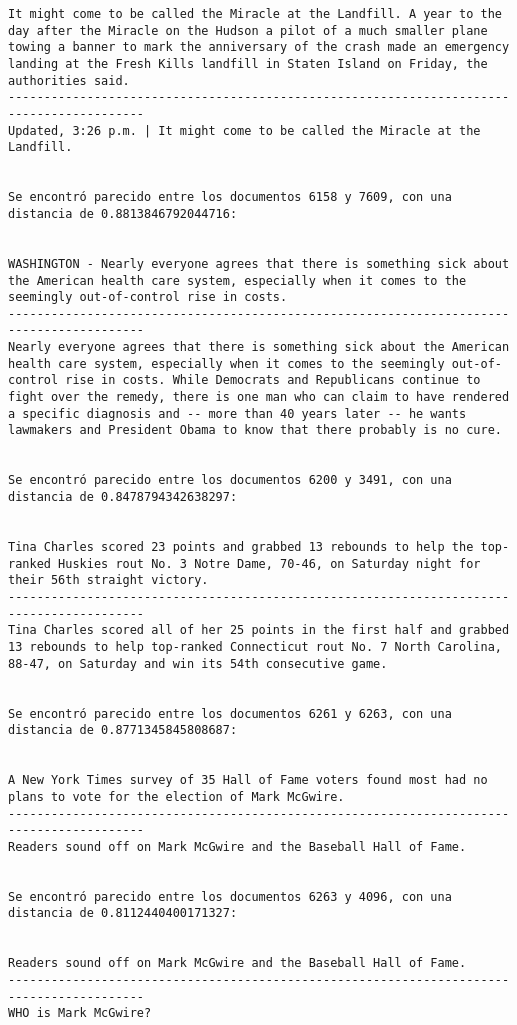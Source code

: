 \documentclass[11pt]{article}
\begin{document}
\begin{Verbatim}[commandchars=\\\{\}]
It might come to be called the Miracle at the Landfill. A year to the day after the Miracle on the Hudson a pilot of a much smaller plane towing a banner to mark the anniversary of the crash made an emergency landing at the Fresh Kills landfill in Staten Island on Friday, the authorities said.
-----------------------------------------------------------------------------------------
Updated, 3:26 p.m. | It might come to be called the Miracle at the Landfill.


Se encontró parecido entre los documentos 6158 y 7609, con una distancia de 0.8813846792044716:


WASHINGTON - Nearly everyone agrees that there is something sick about the American health care system, especially when it comes to the seemingly out-of-control rise in costs.
-----------------------------------------------------------------------------------------
Nearly everyone agrees that there is something sick about the American health care system, especially when it comes to the seemingly out-of-control rise in costs. While Democrats and Republicans continue to fight over the remedy, there is one man who can claim to have rendered a specific diagnosis and -- more than 40 years later -- he wants lawmakers and President Obama to know that there probably is no cure.


Se encontró parecido entre los documentos 6200 y 3491, con una distancia de 0.8478794342638297:


Tina Charles scored 23 points and grabbed 13 rebounds to help the top-ranked Huskies rout No. 3 Notre Dame, 70-46, on Saturday night for their 56th straight victory.
-----------------------------------------------------------------------------------------
Tina Charles scored all of her 25 points in the first half and grabbed 13 rebounds to help top-ranked Connecticut rout No. 7 North Carolina, 88-47, on Saturday and win its 54th consecutive game.


Se encontró parecido entre los documentos 6261 y 6263, con una distancia de 0.8771345845808687:


A New York Times survey of 35 Hall of Fame voters found most had no plans to vote for the election of Mark McGwire.
-----------------------------------------------------------------------------------------
Readers sound off on Mark McGwire and the Baseball Hall of Fame.


Se encontró parecido entre los documentos 6263 y 4096, con una distancia de 0.8112440400171327:


Readers sound off on Mark McGwire and the Baseball Hall of Fame.
-----------------------------------------------------------------------------------------
WHO is Mark McGwire?



\end{Verbatim}
\end{document}
